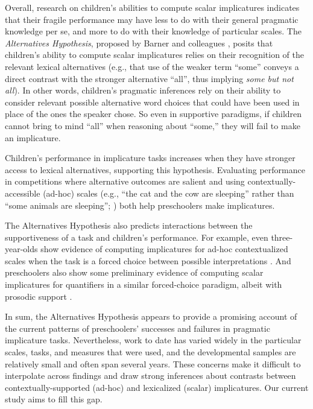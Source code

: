 \documentclass[10pt,letterpaper]{article}
\begin{document}
Overall, research on children's abilities to compute scalar implicatures indicates that their fragile performance may have less to do with their general pragmatic knowledge per se, and more to do with their knowledge of particular scales. The \emph{Alternatives Hypothesis}, proposed by Barner and colleagues \cite{barner2010, barner2011}, posits that children's ability to compute scalar implicatures relies on their recognition of the relevant lexical alternatives (e.g., that use of the weaker term ``some'' conveys a direct contrast with the stronger alternative ``all'', thus implying \emph{some but not all}).  In other words, children's pragmatic inferences rely on their ability to consider relevant possible alternative word choices that could have been used in place of the ones the speaker chose. So even in supportive paradigms, if children cannot bring to mind ``all'' when reasoning about ``some,'' they will fail to make an implicature.

Children's performance in implicature tasks increases when they have stronger access to lexical alternatives, supporting this hypothesis.  Evaluating performance in competitions where alternative outcomes are salient \cite{papafragou2003} and using contextually-accessible (ad-hoc) scales (e.g., ``the cat and the cow are sleeping'' rather than ``some animals are sleeping''; ) both help preschoolers make implicatures. 

The Alternatives Hypothesis also predicts interactions between the supportiveness of a task and children's performance. For example, even three-year-olds show evidence of computing implicatures for ad-hoc contextualized scales when the task is a forced choice between possible interpretations \cite{stiller2014}. And preschoolers also show some preliminary evidence of computing scalar implicatures for quantifiers in a similar forced-choice paradigm, albeit with prosodic support \cite{miller2005}. 

In sum, the Alternatives Hypothesis appears to provide a promising account of the current patterns of preschoolers' successes and failures in pragmatic implicature tasks. Nevertheless, work to date has varied widely in the particular scales, tasks, and measures that were used, and the developmental samples are relatively small and often span several years. These concerns make it difficult to interpolate across findings and draw strong inferences about contrasts between contextually-supported (ad-hoc) and lexicalized (scalar) implicatures. Our current study aims to fill this gap. 
\end{document}
